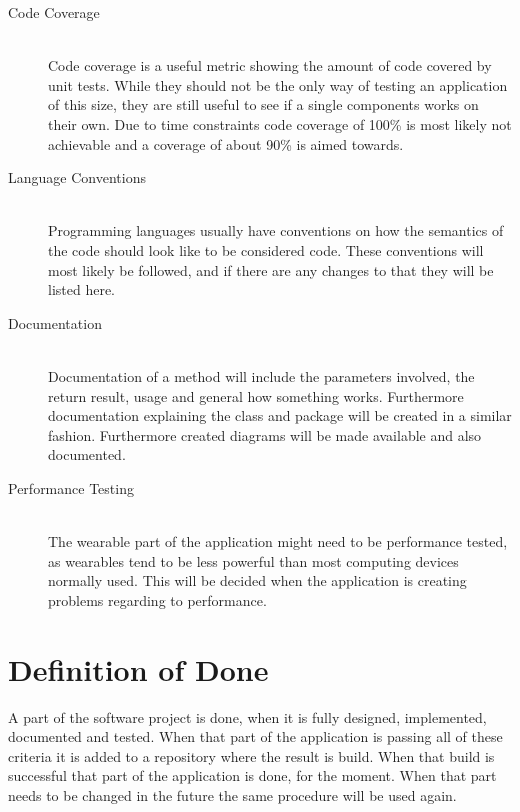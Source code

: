 \begin{description}
	\item[Code Coverage] \hfill \\
		Code coverage is a useful metric showing the amount of code covered by unit tests. While they should not be the only way of testing an application of this size, they are still useful to see if a single components works on their own. Due to time constraints code coverage of 100\% is most likely not achievable and a coverage of about 90\% is aimed towards.
	\item[Language Conventions] \hfill \\
		Programming languages usually have conventions on how the semantics of the code should look like to be considered code. These conventions will most likely be followed, and if there are any changes to that they will be listed here.
	\item[Documentation] \hfill \\
		Documentation of a method will include the parameters involved, the return result, usage and general how something works. Furthermore documentation explaining the class and package will be created in a similar fashion. Furthermore created diagrams will be made available and also documented.
	\item[Performance Testing] \hfill \\
		The wearable part of the application might need to be performance tested, as wearables tend to be less powerful than most computing devices normally used. This will be decided when the application is creating problems regarding to performance.
\end{description}

\section{Definition of Done}\label{sec:definitionOfDone}
A part of the software project is done, when it is fully designed, implemented, documented and tested. When that part of the application is passing all of these criteria it is added to a repository where the result is build. When that build is successful that part of the application is done, for the moment. When that part needs to be changed in the future the same procedure will be used again.